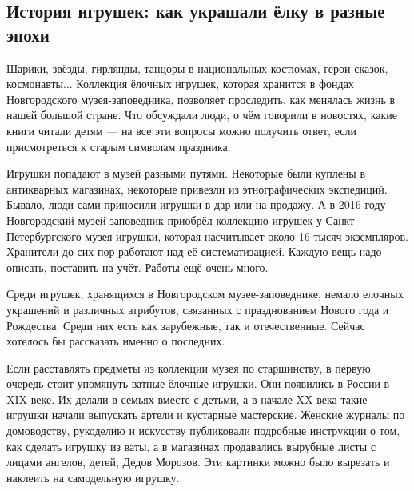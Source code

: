  
 
 
 
 
\subsection{История игрушек: как украшали ёлку в разные эпохи}
\label{sec:24_12_2021.stz.news.ru.novgorod.1.istoria_igrushek}



\begin{zznagolos}
Шарики, звёзды, гирлянды, танцоры в национальных костюмах, герои сказок,
космонавты... Коллекция ёлочных игрушек, которая хранится в фондах
Новгородского музея-заповедника, позволяет проследить, как менялась жизнь в
нашей большой стране. Что обсуждали люди, о чём говорили в новостях, какие
книги читали детям — на все эти вопросы можно получить ответ, если
присмотреться к старым символам праздника.
\end{zznagolos}

Игрушки попадают в музей разными путями. Некоторые были куплены в антикварных
магазинах, некоторые привезли из этнографических экспедиций. Бывало, люди сами
приносили игрушки в дар или на продажу. А в 2016 году Новгородский
музей-заповедник приобрёл коллекцию игрушек у Санкт-Петербургского музея
игрушки, которая насчитывает около 16 тысяч экземпляров. Хранители до сих пор
работают над её систематизацией. Каждую вещь надо описать, поставить на учёт.
Работы ещё очень много.

Среди игрушек, хранящихся в Новгородском музее-заповеднике, немало елочных
украшений и различных атрибутов, связанных с празднованием Нового года и
Рождества. Среди них есть как зарубежные, так и отечественные. Сейчас хотелось
бы рассказать именно о последних. 

Если расставлять предметы из коллекции музея по старшинству, в первую очередь
стоит упомянуть ватные ёлочные игрушки. Они появились в России в XIX веке. Их
делали в семьях вместе с детьми, а в начале XX века такие игрушки начали
выпускать артели и кустарные мастерские. Женские журналы по домоводству,
рукоделию и искусству публиковали подробные инструкции о том, как сделать
игрушку из ваты, а в магазинах продавались вырубные листы с лицами ангелов,
детей, Дедов Морозов. Эти картинки можно было вырезать и наклеить на
самодельную игрушку. 

